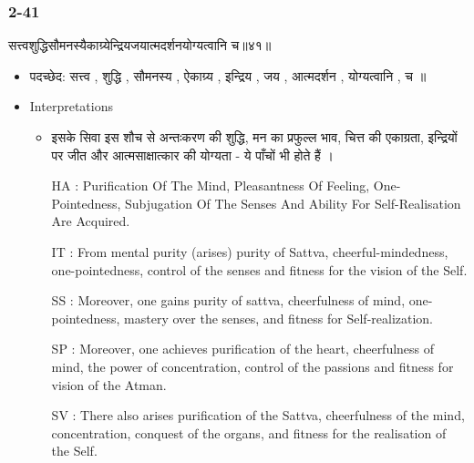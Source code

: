 \begin{frame}[fragile]\frametitle{2-41}
\begin{sanskrit}
सत्त्वशुद्धिसौमनस्यैकाग्र्येन्द्रियजयात्मदर्शनयोग्यत्वानि च॥४१॥
\end{sanskrit}

	\begin{itemize}
	\item पदच्छेद: सत्त्व , शुद्धि , सौमनस्य , ऐकाग्र्य , इन्द्रिय , जय , आत्मदर्शन , योग्यत्वानि , च ॥
	\item Interpretations
		\begin{itemize}
		\item इसके सिवा इस शौच से अन्तःकरण की शुद्धि, मन का प्रफुल्ल भाव, चित्त की एकाग्रता, इन्द्रियों पर जीत और आत्मसाक्षात्कार की योग्यता - ये पाँचों भी होते हैं ।
		\item [HA]: Purification Of The Mind, Pleasantness Of Feeling, One-Pointedness, Subjugation Of The Senses And Ability For Self-Realisation Are Acquired.
		\item [IT]: From mental purity (arises) purity of Sattva, cheerful-mindedness, one-pointedness, control of the senses and fitness for the vision of the Self.
		\item [SS]: Moreover, one gains purity of sattva, cheerfulness of mind, one-pointedness, mastery over the senses, and fitness for Self-realization.
		\item [SP]: Moreover, one achieves purification of the heart, cheerfulness of mind, the power of concentration, control of the passions and fitness for vision of the Atman.
		\item [SV]: There also arises purification of the Sattva, cheerfulness of the mind, concentration, conquest of the organs, and fitness for the realisation of the Self. 
		\end{itemize}
	\end{itemize}	
\end{frame}


